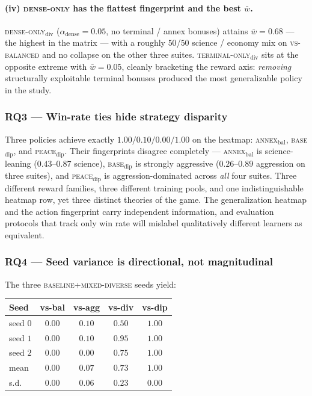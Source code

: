 \documentclass[11pt, a4paper, onecolumn]{article} %
\begin{document}
\paragraph{(iv) \textsc{dense-only} has the flattest fingerprint and the best $\bar{w}$.}
\textsc{dense-only}$_{\text{div}}$ ($\alpha_{\text{dense}}{=}0.05$, no
terminal / annex bonuses) attains $\bar{w}{=}0.68$ --- the highest in the
matrix --- with a roughly $50$/$50$ science / economy mix on
\textsc{vs-balanced} and no collapse on the other three suites.
\textsc{terminal-only}$_{\text{div}}$ sits at the opposite extreme with
$\bar{w}{=}0.05$, cleanly bracketing the reward axis: \emph{removing}
structurally exploitable terminal bonuses produced the most generalizable
policy in the study.

\subsubsection{RQ3 --- Win-rate ties hide strategy disparity}
\label{sec:rq3}

Three policies achieve exactly $1.00/0.10/0.00/1.00$ on the heatmap:
\textsc{annex}$_{\text{bal}}$, \textsc{base}$_{\text{dip}}$, and
\textsc{peace}$_{\text{dip}}$. Their fingerprints disagree completely ---
\textsc{annex}$_{\text{bal}}$ is science-leaning ($0.43$--$0.87$ science),
\textsc{base}$_{\text{dip}}$ is strongly aggressive ($0.26$--$0.89$
aggression on three suites), and \textsc{peace}$_{\text{dip}}$ is
aggression-dominated across \emph{all} four suites. Three different reward
families, three different training pools, and one indistinguishable heatmap
row, yet three distinct theories of the game. The generalization heatmap and
the action fingerprint carry independent information, and evaluation
protocols that track only win rate will mislabel qualitatively different
learners as equivalent.

\subsubsection{RQ4 --- Seed variance is directional, not magnitudinal}
\label{sec:rq4}

The three \textsc{baseline}+\textsc{mixed-diverse} seeds yield:

\begin{center}
\small
\begin{tabular}{lcccc}
\toprule
Seed & vs-bal & vs-agg & vs-div & vs-dip \\
\midrule
seed $0$ & $0.00$ & $0.10$ & $0.50$ & $1.00$ \\
seed $1$ & $0.00$ & $0.10$ & $0.95$ & $1.00$ \\
seed $2$ & $0.00$ & $0.00$ & $0.75$ & $1.00$ \\
\midrule
mean     & $0.00$ & $0.07$ & $\mathbf{0.73}$ & $1.00$ \\
s.d.     & $0.00$ & $0.06$ & $\mathbf{0.23}$ & $0.00$ \\
\bottomrule
\end{tabular}
\end{center}
\end{document}
